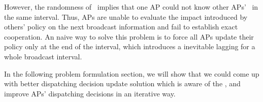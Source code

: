 However, the randomness of \brdelay~implies that one AP could not know other APs' \brdelay~in the same interval.
Thus, APs are unable to evaluate the impact introduced by others' policy on the next broadcast information and fail to establish exact cooperation.
An naive way to solve this problem is to force all APs update their policy only at the end of the interval, which introduces a inevitable lagging for a whole broadcast interval.

In the following problem formulation section, we will show that we could come up with better dispatching decision update solution which is aware of the \brdelay, and improve APs' dispatching decisions in an iterative way.
